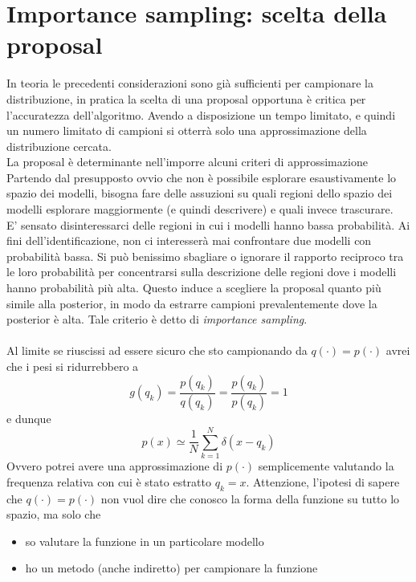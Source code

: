 \documentclass[10pt,a4paper,oneside,openany,noindent]{report}
\begin{document}
\section{Importance sampling: scelta della proposal}
In teoria le precedenti considerazioni sono già sufficienti per campionare la distribuzione, in pratica la scelta di una proposal opportuna è critica per l'accuratezza dell'algoritmo. Avendo a disposizione un tempo limitato, e quindi un numero limitato di campioni si otterrà solo una approssimazione della distribuzione cercata.\\
La proposal è determinante nell'imporre alcuni criteri di approssimazione\\
Partendo dal presupposto ovvio che non è possibile esplorare esaustivamente lo spazio dei modelli, bisogna fare delle assuzioni su quali regioni dello spazio dei modelli esplorare maggiormente (e quindi descrivere) e quali invece trascurare.\\
E' sensato disinteressarci delle regioni in cui i modelli hanno bassa probabilità.
Ai fini dell'identificazione, non ci interesserà mai confrontare due modelli con probabilità bassa. Si può benissimo sbagliare o ignorare il rapporto reciproco tra le loro probabilità per concentrarsi sulla descrizione delle regioni dove i modelli hanno probabilità più alta.
Questo induce a scegliere la proposal quanto più simile alla posterior, in modo da estrarre campioni prevalentemente dove la posterior è alta.
Tale criterio è detto di \emph{importance sampling}.\\ \\
Al limite se riuscissi ad essere sicuro che sto campionando da $q(\cdot)=p(\cdot)$ 
avrei che i pesi si ridurrebbero a
\begin{equation}
g(q_k)=\frac{p(q_k)}{q(q_k)}=\frac{p(q_k)}{p(q_k)}=1
\end{equation}
e dunque
\begin{equation}
p(x)\simeq \frac{1}{N}\sum_{k=1}^N \delta(x-q_k)
\end{equation}
Ovvero potrei avere una approssimazione di $p(\cdot)$ semplicemente valutando la frequenza relativa con cui è stato estratto $q_k=x$.
Attenzione, l'ipotesi di sapere che $q(\cdot)=p(\cdot)$ non vuol dire che conosco la forma della funzione su tutto lo spazio, ma solo che
\begin{itemize}
\item so valutare la funzione in un particolare modello
\item ho un metodo (anche indiretto) per campionare la funzione
\end{itemize}
\end{document}
